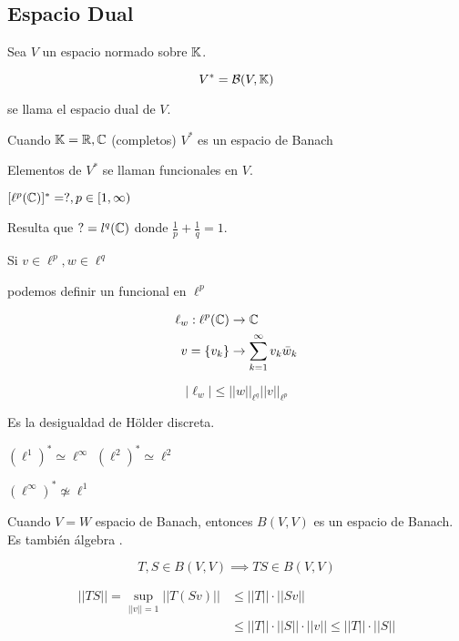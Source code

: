     \subsection{Espacio Dual}

    \begin{fdefinition}
        Sea $V$ un espacio normado sobre $\mathbb{K}$.

        \[V^*=\mathcal{B}(V,\mathbb{K})\]

        se llama el espacio \color{red} dual \color{black} de $V$.
    \end{fdefinition}

    \begin{ftheorem}
        Cuando $\mathbb{K}=\mathbb{R},\mathbb{C}$ (completos) $V^*$ es un espacio de Banach
    \end{ftheorem}

    Elementos de $V^*$ se llaman \color{red} funcionales \color{black} en $V$.


    \begin{fexample}
        $[\ell^p(\mathbb{C})]^* =?,p\in[1,\infty)$

        Resulta que $?=l^q(\mathbb{C})$ donde $\frac{1}{p}+\frac{1}{q}=1$.

        Si $v\in \ell^p,w\in\ell^q$

        podemos definir un funcional en $\ell^p$

        \begin{align*}\ell_w:\ell^p(\mathbb{C})&\to\mathbb{C}\\
        v=\{v_k\}&\to \sum_{k=1}^\infty v_k\bar w_k\end{align*}

        \[|\ell_w|\leq ||w||_{\ell^q}||v||_{\ell^p}\]

        Es la desigualdad de Hölder discreta.
    \end{fexample}

    $(\ell^1)^*\simeq \ell^\infty$
    $(\ell^2)^*\simeq \ell^2$

    \begin{fnote}
        $(\ell^\infty)^*\not\simeq \ell^1$
    \end{fnote}

Cuando $V=W$ espacio de Banach, entonces $B(V,V)$ es un espacio de Banach. Es también \color{red} álgebra \color{black}.

\[T,S\in B(V,V)\implies TS\in B(V,V)\]

\begin{align*}
    ||TS||=\sup_{||v||=1} ||T(Sv)||&\leq ||T||\cdot ||Sv||\\
    &\leq ||T||\cdot ||S||\cdot ||v||\leq ||T||\cdot ||S||
\end{align*}

